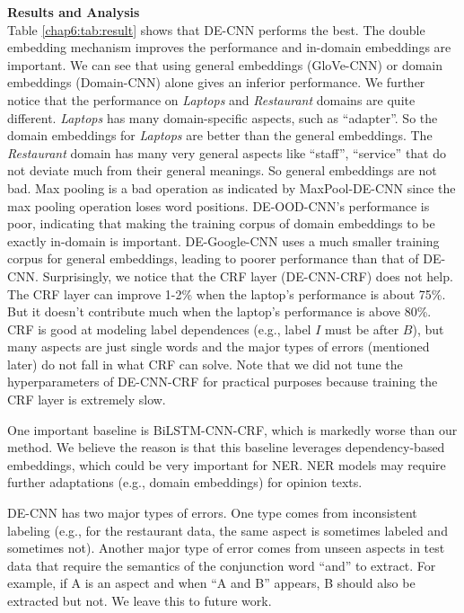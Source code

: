 \textbf{Results and Analysis}\\
Table \ref{chap6:tab:result} shows that DE-CNN performs the best. 
The double embedding mechanism improves the performance and in-domain embeddings are important. 
We can see that using general embeddings (GloVe-CNN) or domain embeddings (Domain-CNN) alone gives an inferior performance. 
We further notice that the performance on \textit{Laptops} and \textit{Restaurant} domains are quite different. 
\textit{Laptops} has many domain-specific aspects, such as ``adapter''. 
So the domain embeddings for \textit{Laptops} are better than the general embeddings. 
The \textit{Restaurant} domain has many very general aspects like ``staff'', ``service'' that do not deviate much from their general meanings. 
So general embeddings are not bad. 
Max pooling is a bad operation as indicated by MaxPool-DE-CNN since the max pooling operation loses word positions.
DE-OOD-CNN's performance is poor, indicating that making the training corpus of domain embeddings to be exactly in-domain is important.
DE-Google-CNN uses a much smaller training corpus for general embeddings, leading to poorer performance than that of DE-CNN.
Surprisingly, we notice that the CRF layer (DE-CNN-CRF) does not help.
The CRF layer can improve 1-2\% when the laptop's performance is about 75\%.
But it doesn't contribute much when the laptop's performance is above 80\%. 
CRF is good at modeling label dependences (e.g., label $I$ must be after $B$), but many aspects are just single words and the major types of errors (mentioned later) do not fall in what CRF can solve.
Note that we did not tune the hyperparameters of DE-CNN-CRF for practical purposes because training the CRF layer is extremely slow. 

One important baseline is BiLSTM-CNN-CRF, which is markedly worse than our method. 
We believe the reason is that this baseline leverages dependency-based embeddings\cite{levy2014dependency}, 
which could be very important for NER.
NER models may require further adaptations (e.g., domain embeddings) for opinion texts. 

DE-CNN has two major types of errors.
One type comes from inconsistent labeling (e.g., for the restaurant data, the same aspect is sometimes labeled and sometimes not). 
Another major type of error comes from unseen aspects in test data that require the semantics of the conjunction word ``and'' to extract. For example, if A is an aspect and when ``A and B'' appears, B should also be extracted but not.
We leave this to future work.



